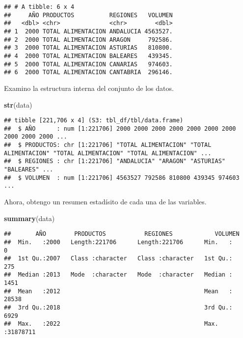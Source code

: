 \documentclass[
]{article}
\newenvironment{Shaded}{\begin{snugshade}}{\end{snugshade}}
\newcommand{\FunctionTok}[1]{\textcolor[rgb]{0.13,0.29,0.53}{\textbf{#1}}}
\newcommand{\NormalTok}[1]{#1}
\begin{document}
\begin{verbatim}
## # A tibble: 6 x 4
##     AÑO PRODUCTOS          REGIONES   VOLUMEN
##   <dbl> <chr>              <chr>        <dbl>
## 1  2000 TOTAL ALIMENTACION ANDALUCIA 4563527.
## 2  2000 TOTAL ALIMENTACION ARAGON     792586.
## 3  2000 TOTAL ALIMENTACION ASTURIAS   810800.
## 4  2000 TOTAL ALIMENTACION BALEARES   439345.
## 5  2000 TOTAL ALIMENTACION CANARIAS   974603.
## 6  2000 TOTAL ALIMENTACION CANTABRIA  296146.
\end{verbatim}

Examino la estructura interna del conjunto de los datos.

\begin{Shaded}
\begin{Highlighting}[]
\FunctionTok{str}\NormalTok{(data)}
\end{Highlighting}
\end{Shaded}

\begin{verbatim}
## tibble [221,706 x 4] (S3: tbl_df/tbl/data.frame)
##  $ AÑO      : num [1:221706] 2000 2000 2000 2000 2000 2000 2000 2000 2000 2000 ...
##  $ PRODUCTOS: chr [1:221706] "TOTAL ALIMENTACION" "TOTAL ALIMENTACION" "TOTAL ALIMENTACION" "TOTAL ALIMENTACION" ...
##  $ REGIONES : chr [1:221706] "ANDALUCIA" "ARAGON" "ASTURIAS" "BALEARES" ...
##  $ VOLUMEN  : num [1:221706] 4563527 792586 810800 439345 974603 ...
\end{verbatim}

Ahora, obtengo un resumen estadísito de cada una de las variables.

\begin{Shaded}
\begin{Highlighting}[]
\FunctionTok{summary}\NormalTok{(data)}
\end{Highlighting}
\end{Shaded}

\begin{verbatim}
##       AÑO        PRODUCTOS           REGIONES            VOLUMEN        
##  Min.   :2000   Length:221706      Length:221706      Min.   :       0  
##  1st Qu.:2007   Class :character   Class :character   1st Qu.:     275  
##  Median :2013   Mode  :character   Mode  :character   Median :    1451  
##  Mean   :2012                                         Mean   :   28538  
##  3rd Qu.:2018                                         3rd Qu.:    6929  
##  Max.   :2022                                         Max.   :31878711
\end{verbatim}
\end{document}
